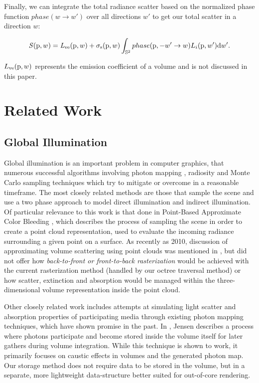 \documentclass[12pt]{ucthesis}
\begin{document}
Finally, we can integrate the total radiance scatter based on the normalized phase function $phase(w \to w')$ over all directions $w'$ to get our total scatter in a direction $w$:

\begin{displaymath}
\mathit{S}(\textup{p},w) = \mathit{L}_{\textup{ve}}(\textup{p},w) + \sigma_{\textup{s}}(\textup{p}, w) \int_{\mathbb{S}^2} phase(\textup{p}, -w' \to w) L_{i}(\textup{p},w')\textup{d}w'.
\end{displaymath}

$L_{\textup{ve}}(\textup{p}, w)$ represents the emission coefficient of a volume and is not discussed in this paper.




\chapter{Related Work}

\section{Global Illumination}
Global illumination is an important problem in computer graphics, that numerous successful algorithms involving photon mapping \cite{Jensen:2009}, radiosity \cite{radiosity} and Monte Carlo sampling techniques \cite{monte_carlo} which try to mitigate or overcome in a reasonable timeframe.  The most closely related methods are those that sample the scene and use a two phase approach to model direct illumination and indirect illumination. Of particular relevance to this work is that done in Point-Based Approximate Color Bleeding \cite{christensen:2008}, which describes the process of sampling the scene in order to create a point cloud representation, used to evaluate the incoming radiance surrounding a given point on a surface.  As recently as 2010, discussion of approximating volume scattering using point clouds was mentioned in \cite{christensen:siggraph}, but did not offer how \textit{back-to-front or front-to-back rasterization} would be achieved with the current rasterization method (handled by our octree traversal method) or how scatter, extinction and absorption would be managed within the three-dimensional volume representation inside the point cloud.

Other closely related work includes attempts at simulating light scatter and absorption properties of participating media through existing photon mapping techniques, which have shown promise in the past.  In \cite{jensen:1998}, Jensen describes a process where photons participate and become stored inside the volume itself for later gathers during volume integration.  While this technique is shown to work, it primarily focuses on caustic effects in volumes and the generated photon map.  Our storage method does not require data to be stored in the volume, but in a separate, more lightweight data-structure better suited for out-of-core rendering.
\end{document}
